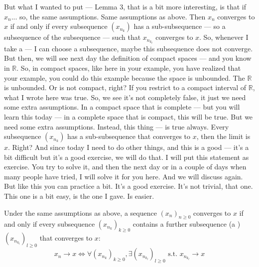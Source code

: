 
\begin{spoken-clean}[00:13:41 - 00:15:50]
But what I wanted to put — Lemma 3, that is a bit more interesting, is that if $x_n$... so, the same assumptions. Same assumptions as above. Then $x_n$ converges to $x$ if and only if every subsequence $(x_{n_k})$ has a sub-subsequence — so a subsequence of the subsequence — such that $x_{n_{k_l}}$ converges to $x$. So, whenever I take a — I can choose a subsequence, maybe this subsequence does not converge. But then, we will see next day the definition of compact spaces — and you know in $\mathbb{R}$. So, in compact spaces, like here in your example, you have realized that your example, you could do this example because the space is unbounded. The $\mathbb{R}$ is unbounded. Or is not compact, right? If you restrict to a compact interval of $\mathbb{R}$, what I wrote here was true. So, we see it's not completely false, it just we need some extra assumptions. In a compact space that is complete — but you will learn this today — in a complete space that is compact, this will be true. But we need some extra assumptions. Instead, this thing — is true always. Every subsequence $(x_{n_k})$ has a sub-subsequence that converges to $x$, then the limit is $x$. Right? And since today I need to do other things, and this is a good — it's a bit difficult but it's a good exercise, we will do that. I will put this statement as exercise. You try to solve it, and then the next day or in a couple of days when many people have tried, I will solve it for you here. And we will discuss again. But like this you can practice a bit. It's a good exercise. It's not trivial, that one. This one is a bit easy, is the one I gave. Is easier.
\end{spoken-clean}

\begin{math-stroke}
\begin{lemma}\label{lem:sub-subsequence}
Under the same assumptions as above, a sequence $(x_n)_{n \ge 0}$ converges to $x$ if and only if every subsequence $(x_{n_k})_{k \ge 0}$ contains a further subsequence (a ) $(x_{n_{k_l}})_{l \ge 0}$ that converges to $x$:
\[ x_n \to x \iff \forall (x_{n_k})_{k \ge 0}, \exists (x_{n_{k_l}})_{l \ge 0} \text{ s.t. } x_{n_{k_l}} \to x \]
\end{lemma}
\end{math-stroke}

